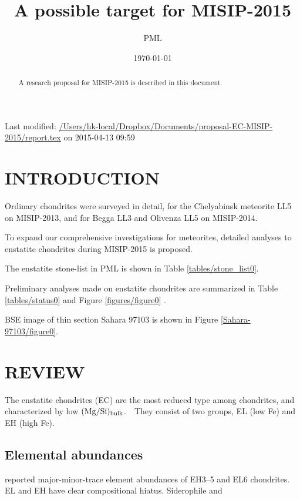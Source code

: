 \documentclass[12pt]{article}
\title{A possible target for MISIP-2015}%
\author{PML}%
\date{\today}%
\begin{document}
\maketitle
{} %
Last modified: \url{/Users/hk-local/Dropbox/Documents/proposal-EC-MISIP-2015/report.tex} on 2015-04-13 09:59
\begin{abstract}
  A research proposal for MISIP-2015 is described in this document.
\end{abstract}
\tableofcontents


\section{INTRODUCTION}
Ordinary chondrites were surveyed in detail, for the Chelyabinsk
meteorite LL5 on MISIP-2013, and for Begga LL3 and Olivenza LL5 on
MISIP-2014.

To expand our comprehensive investigations for meteorites, detailed
analyses to enstatite chondrites during MISIP-2015 is proposed.


The enstatite stone-list in PML is shown in Table
\ref{tables/stone_list0}.  

Preliminary analyses made on enstatite chondrites
are summarized in Table \ref{tables/status0} and Figure
\ref{figures/figure0} \citeyearpar{20140729091146-980887}.





BSE image of thin section Sahara 97103 is shown in Figure
\ref{Sahara-97103/figure0}.





\section{REVIEW}
The enstatite chondrites (EC) are the most reduced type among
chondrites, and characterized by low $\rm (Mg/Si)_{bulk}$.　They
consist of two groups, EL (low Fe) and EH (high Fe).

\subsection{Elemental abundances}
\cite{Kallemeyn:1986} reported major-minor-trace element abundances of
EH3--5 and EL6 chondrites. EL and EH have clear compositional
hiatus. Siderophile and
\end{document}
